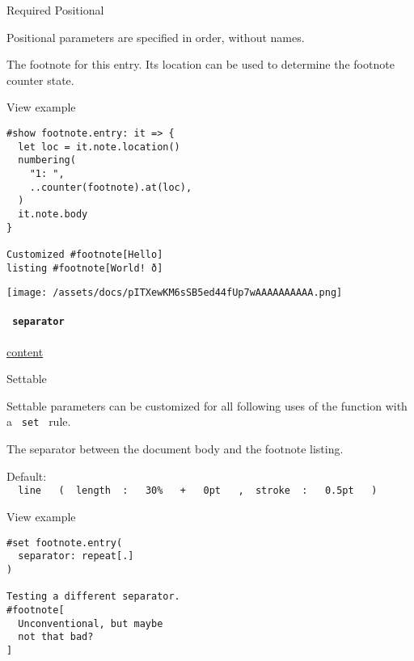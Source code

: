 {Required} {{ Positional }}

\label{definitions-entry-note-positional-tooltip}
Positional parameters are specified in order, without names.

The footnote for this entry. It\textquotesingle s location can be used
to determine the footnote counter state.


View example

\begin{verbatim}
#show footnote.entry: it => {
  let loc = it.note.location()
  numbering(
    "1: ",
    ..counter(footnote).at(loc),
  )
  it.note.body
}

Customized #footnote[Hello]
listing #footnote[World! ð]
\end{verbatim}

\texttt{[image: /assets/docs/pITXewKM6sSB5ed44fUp7wAAAAAAAAAA.png]}

\paragraph{\texorpdfstring{\texttt{\ separator\ }}{ separator }}\label{definitions-entry-separator}

\href{/docs/reference/foundations/content/}{content}

{{ Settable }}

\label{definitions-entry-separator-settable-tooltip}
Settable parameters can be customized for all following uses of the
function with a \texttt{\ set\ } rule.

The separator between the document body and the footnote listing.

Default:
\texttt{\ }{\texttt{\ line\ }}\texttt{\ }{\texttt{\ (\ }}\texttt{\ length\ }{\texttt{\ :\ }}\texttt{\ }{\texttt{\ 30\%\ }}\texttt{\ }{\texttt{\ +\ }}\texttt{\ }{\texttt{\ 0pt\ }}\texttt{\ }{\texttt{\ ,\ }}\texttt{\ stroke\ }{\texttt{\ :\ }}\texttt{\ }{\texttt{\ 0.5pt\ }}\texttt{\ }{\texttt{\ )\ }}\texttt{\ }


View example

\begin{verbatim}
#set footnote.entry(
  separator: repeat[.]
)

Testing a different separator.
#footnote[
  Unconventional, but maybe
  not that bad?
]
\end{verbatim}

